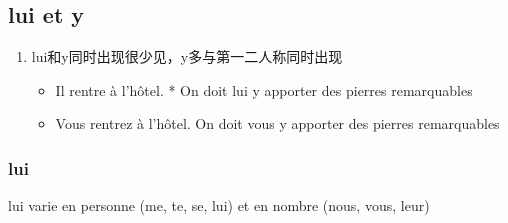 \documentclass[UTF8]{report}
\begin{document}
\subsection{lui et y}
\begin{enumerate}
    \item lui和y同时出现很少见，y多与第一二人称同时出现
    \begin{itemize}
        \item Il rentre à l’hôtel. * On doit lui y apporter des pierres remarquables
        \item Vous rentrez à l’hôtel. On doit vous y apporter des pierres remarquables
    \end{itemize}
\end{enumerate}

\subsubsection{lui}
lui varie en personne (me, te, se, lui) et en nombre (nous, vous, leur)
\end{document}
